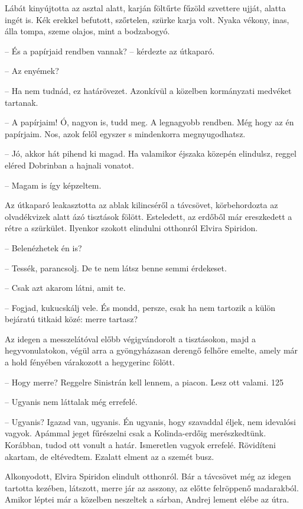 \documentclass{IEEEtran}
\begin{document}
Lábát kinyújtotta az asztal alatt, karján föltűrte fűzöld szvettere ujját,
alatta ingét is. Kék erekkel befutott, szőrtelen, szürke karja volt. Nyaka
vékony, inas, álla tompa, szeme olajos, mint a bodzabogyó.

– És a papírjaid rendben vannak? – kérdezte az útkaparó.

– Az enyémek?

– Ha nem tudnád, ez határövezet. Azonkívül a közelben kormányzati medvéket
tartanak.

– A papírjaim! Ó, nagyon is, tudd meg. A legnagyobb rendben. Még hogy az én
papírjaim. Nos, azok felől egyszer s mindenkorra megnyugodhatsz.

– Jó, akkor hát pihend ki magad. Ha valamikor éjszaka közepén elindulsz,
reggel eléred Dobrinban a hajnali vonatot.

– Magam is így képzeltem.

Az útkaparó leakasztotta az ablak kilincséről a távcsövet, körbehordozta az
olvadékvizek alatt ázó tisztások fölött. Esteledett, az erdőből már
ereszkedett a rétre a szürkület. Ilyenkor szokott elindulni otthonról Elvira
Spiridon.

– Belenézhetek én is?

– Tessék, parancsolj. De te nem látsz benne semmi érdekeset.

– Csak azt akarom látni, amit te.

– Fogjad, kukucskálj vele. És mondd, persze, csak ha nem tartozik a külön
bejáratú titkaid közé: merre tartasz?

Az idegen a messzelátóval előbb végigvándorolt a tisztásokon, majd a
hegyvonulatokon, végül arra a gyöngyházasan derengő felhőre emelte, amely már
a hold fényében várakozott a hegygerinc fölött.

– Hogy merre? Reggelre Sinistrán kell lennem, a piacon. Lesz ott valami.
125

– Ugyanis nem láttalak még errefelé.

– Ugyanis? Igazad van, ugyanis. Én ugyanis, hogy szavaddal éljek, nem
idevalósi vagyok. Apámmal jeget fűrészelni csak a Kolinda-erdőig
merészkedtünk. Korábban, tudod ott vonult a határ. Ismeretlen vagyok errefelé.
Rövidíteni akartam, de eltévedtem. Ezalatt elment az a szemét busz.

Alkonyodott, Elvira Spiridon elindult otthonról. Bár a távcsövet még az idegen
tartotta kezében, látszott, merre jár az asszony, az előtte felröppenő
madarakból. Amikor léptei már a közelben neszeltek a sárban, Andrej lement
elébe az útra.
\end{document}
